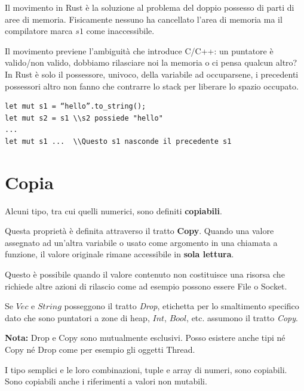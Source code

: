 Il movimento in Rust è la soluzione al problema del doppio possesso di parti di aree di memoria. Fisicamente nessuno ha cancellato l'area di memoria ma il compilatore marca $s1$ come inaccessibile.\newline




Il movimento previene l'ambiguità che introduce C/C++: un puntatore è valido/non valido, dobbiamo rilasciare noi la memoria o ci pensa qualcun altro?
In Rust è solo il possessore, univoco,  della variabile ad occuparsene, i precedenti possessori altro non fanno che contrarre lo stack per liberare lo spazio occupato.


\begin{verbatim}
let mut s1 = “hello”.to_string();
let mut s2 = s1 \\s2 possiede "hello"
...
let mut s1 ...  \\Questo s1 nasconde il precedente s1
\end{verbatim}


\section{Copia}
Alcuni tipo, tra cui quelli numerici, sono definiti \textbf{copiabili}.

Questa proprietà è definita attraverso il tratto \textbf{Copy}.
Quando una valore assegnato ad un'altra variabile o usato come argomento in una chiamata a funzione, il valore originale rimane accessibile in \textbf{sola lettura}.

Questo è possibile quando il valore contenuto non costituisce una risorsa che richiede altre azioni di rilascio come ad esempio possono essere File o Socket.\newline

Se $Vec$ e $String$ posseggono il tratto \textit{Drop}, etichetta per lo smaltimento specifico dato che sono puntatori a zone di heap, $Int$, $Bool$, etc. assumono il tratto \textit{Copy}.\newline

\noindent
\begin{tcolorbox}
  \textbf{Nota:} Drop e Copy sono mutualmente esclusivi. Posso esistere anche tipi né Copy né Drop come per esempio gli oggetti Thread.
\end{tcolorbox}

I tipo semplici e le loro combinazioni, tuple e array di numeri, sono copiabili. Sono copiabili anche i riferimenti a valori non mutabili.

